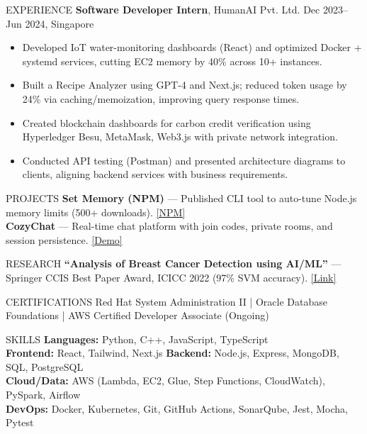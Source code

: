 \documentclass[10pt]{resume}
\begin{document}
\begin{rSection}{EXPERIENCE}
\textbf{Software Developer Intern}, HumanAI Pvt. Ltd. \hfill Dec 2023--Jun 2024, Singapore
\begin{itemize}
    \item Developed IoT water-monitoring dashboards (React) and optimized Docker + systemd services, cutting EC2 memory by 40\% across 10+ instances.
    \item Built a Recipe Analyzer using GPT-4 and Next.js; reduced token usage by 24\% via caching/memoization, improving query response times.
    \item Created blockchain dashboards for carbon credit verification using Hyperledger Besu, MetaMask, Web3.js with private network integration.
    \item Conducted API testing (Postman) and presented architecture diagrams to clients, aligning backend services with business requirements.
\end{itemize}
\end{rSection}

\begin{rSection}{PROJECTS}
\textbf{Set Memory (NPM)} — Published CLI tool to auto-tune Node.js memory limits (500+ downloads). \href{https://www.npmjs.com/package/set-memory}{[NPM]} \\
\textbf{CozyChat} — Real-time chat platform with join codes, private rooms, and session persistence. \href{https://cozy-chat-frontend-30.vercel.app/}{[Demo]}
\end{rSection}

\begin{rSection}{RESEARCH}
\textbf{“Analysis of Breast Cancer Detection using AI/ML”} — Springer CCIS Best Paper Award, ICICC 2022 (97\% SVM accuracy). \href{https://link.springer.com/chapter/10.1007/978-981-19-4990-6_57}{[Link]}
\end{rSection}

\begin{rSection}{CERTIFICATIONS}
Red Hat System Administration II \quad | \quad Oracle Database Foundations \quad | \quad AWS Certified Developer Associate (Ongoing)
\end{rSection}

\begin{rSection}{SKILLS}
\textbf{Languages:} Python, C++, JavaScript, TypeScript \\
\textbf{Frontend:} React, Tailwind, Next.js \quad
\textbf{Backend:} Node.js, Express, MongoDB, SQL, PostgreSQL \\
\textbf{Cloud/Data:} AWS (Lambda, EC2, Glue, Step Functions, CloudWatch), PySpark, Airflow \\
\textbf{DevOps:} Docker, Kubernetes, Git, GitHub Actions, SonarQube, Jest, Mocha, Pytest
\end{rSection}
\end{document}
